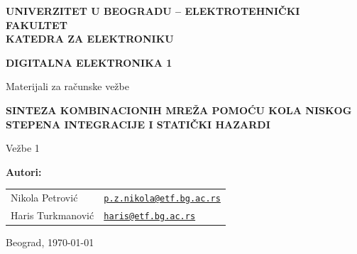 \documentclass[a4paper,11pt]{article}
\numberwithin{equation}{section} %
\begin{document}
\begin{titlepage}
  \thispagestyle{empty}
  \begin{center}

    {\Large\bfseries
    UNIVERZITET U BEOGRADU -- ELEKTROTEHNIČKI FAKULTET\\
    KATEDRA ZA ELEKTRONIKU\par}

    \vspace{25mm}

    {\LARGE\bfseries DIGITALNA ELEKTRONIKA 1\par}
    \vspace{2mm}
    {\large Materijali za računske vežbe\par}

    \vspace{18mm}

    {\Large\bfseries
    SINTEZA KOMBINACIONIH MREŽA POMOĆU KOLA NISKOG 
    STEPENA INTEGRACIJE I STATIČKI HAZARDI\par}
    \vspace{3mm}
    {\large Vežbe 1\par}

    \vfill

\begin{minipage}{0.62\linewidth}
  \raggedright
  \textbf{Autori:}\\[4pt]
  \small
  \begin{tabular}{@{}l l@{}}
    Nikola Petrović & \href{mailto:p.z.nikola@etf.bg.ac.rs}{\texttt{p.z.nikola@etf.bg.ac.rs}} \\
    Haris Turkmanović & \href{mailto:haris@etf.bg.ac.rs}{\texttt{haris@etf.bg.ac.rs}} \\
  \end{tabular}
\end{minipage}
\hfill
\begin{minipage}{0.34\linewidth}
  \raggedleft
  Beograd, \today
\end{minipage}

  \end{center}
\end{titlepage}


\tableofcontents
\newpage
\end{document}
